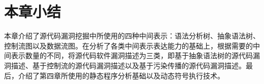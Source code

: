 %
%
%
%




\section{本章小结}

本章介绍了源代码漏洞挖掘中所使用的四种中间表示：语法分析树、抽象语法树、控制流图以及数据流图。在分析了各类中间表示表达能力的基础上，根据需要的中间表示数量的不同，将源代码软件漏洞描述为三类，即基于抽象语法树的源代码漏洞描述、基于控制流的源代码漏洞描述以及基于污染传播的源代码漏洞描述。最后，介绍了第四章所使用的静态程序分析基础以及动态符号执行技术。

